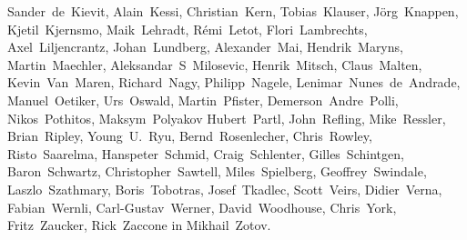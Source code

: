 {Sander~de~Kievit,       %
Alain~Kessi,            %
Christian~Kern,         %
Tobias~Klauser,         %
J\"org~Knappen,         %
Kjetil~Kjernsmo,        %
Maik~Lehradt,           %
R\'emi~Letot,           %
Flori~Lambrechts,       %
Axel~Liljencrantz,      %
Johan~Lundberg,         %
Alexander~Mai,          %
Hendrik~Maryns,         %
Martin~Maechler,        %
Aleksandar~S~Milosevic, %
Henrik~Mitsch,          %
Claus~Malten,           %
Kevin~Van~Maren,        %
Richard~Nagy,           %
Philipp~Nagele,         %
Lenimar~Nunes~de~Andrade, %
Manuel~Oetiker,         %
Urs~Oswald,             %
Martin~Pfister,		%
Demerson~Andre~Polli,   %
Nikos~Pothitos,		%
Maksym~Polyakov         %
Hubert~Partl,           %
John~Refling,           %
Mike~Ressler,           %
Brian~Ripley,           %
Young~U.~Ryu,           %
Bernd~Rosenlecher,      %
Chris~Rowley,           %
Risto~Saarelma,         %
Hanspeter~Schmid,       %
Craig~Schlenter,        %
Gilles~Schintgen,       %
Baron~Schwartz,         %
Christopher~Sawtell,    %
Miles~Spielberg,        %
Geoffrey~Swindale,      %
Laszlo~Szathmary,       %
Boris~Tobotras,         %
Josef~Tkadlec,          %
Scott~Veirs,            %
Didier~Verna,           %
Fabian~Wernli,          %
Carl-Gustav~Werner,     %
David~Woodhouse,        %
Chris~York,             %
Fritz~Zaucker,          %
Rick~Zaccone           %
in Mikhail~Zotov.      %

}




\pagebreak
\endinput
%

